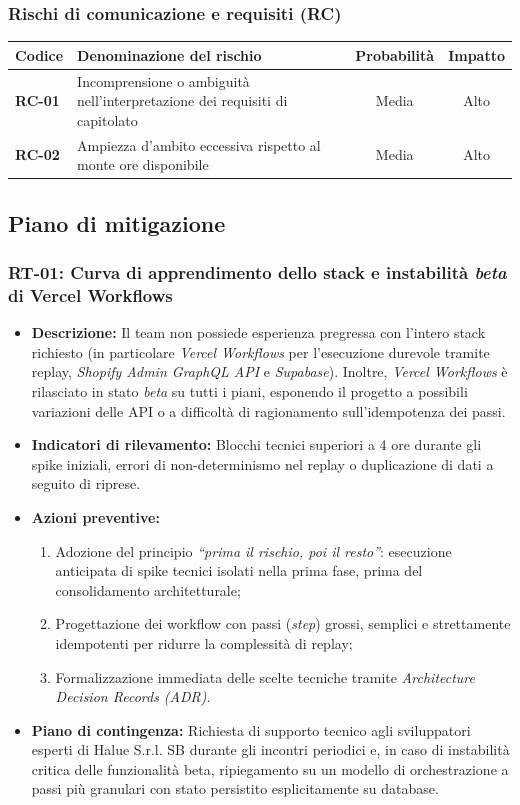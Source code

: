 \subsubsection{Rischi di comunicazione e requisiti (RC)}
\vspace{2mm}
\noindent
\begin{tabularx}{\textwidth}{|l X c c|}
\hline
\textbf{Codice} & \textbf{Denominazione del rischio} & \textbf{Probabilità} & \textbf{Impatto} \\
\hline
\textbf{RC-01} & Incomprensione o ambiguità nell'interpretazione dei requisiti di capitolato & Media & Alto \\
\hline
\textbf{RC-02} & Ampiezza d'ambito eccessiva rispetto al monte ore disponibile & Media & Alto \\
\hline
\end{tabularx}

\subsection{Piano di mitigazione}
\subsubsection{RT-01: Curva di apprendimento dello stack e instabilità \textit{beta} di Vercel Workflows}
\begin{itemize}
    \item \textbf{Descrizione:} Il team non possiede esperienza pregressa con l'intero stack richiesto (in particolare \textit{Vercel Workflows} per l'esecuzione durevole tramite replay, \textit{Shopify Admin GraphQL API} e \textit{Supabase}). Inoltre, \textit{Vercel Workflows} è rilasciato in stato \textit{beta} su tutti i piani, esponendo il progetto a possibili variazioni delle API o a difficoltà di ragionamento sull'idempotenza dei passi.
    \item \textbf{Indicatori di rilevamento:} Blocchi tecnici superiori a 4 ore durante gli spike iniziali, errori di non-determinismo nel replay o duplicazione di dati a seguito di riprese.
    \item \textbf{Azioni preventive:}
    \begin{enumerate}
        \item Adozione del principio \textit{``prima il rischio, poi il resto''}: esecuzione anticipata di spike tecnici isolati nella prima fase, prima del consolidamento architetturale;
        \item Progettazione dei workflow con passi (\textit{step}) grossi, semplici e strettamente idempotenti per ridurre la complessità di replay;
        \item Formalizzazione immediata delle scelte tecniche tramite \textit{Architecture Decision Records (ADR)}.
    \end{enumerate}
    \item \textbf{Piano di contingenza:} Richiesta di supporto tecnico agli sviluppatori esperti di Halue S.r.l. SB durante gli incontri periodici e, in caso di instabilità critica delle funzionalità beta, ripiegamento su un modello di orchestrazione a passi più granulari con stato persistito esplicitamente su database.
\end{itemize}

